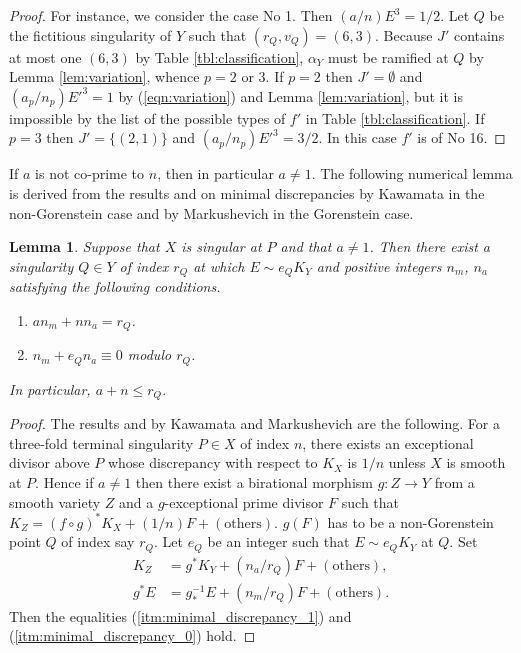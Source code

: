 \documentclass[a4paper,11pt]{amsart}
\newtheorem{lemma}[theorem]{Lemma}
\theoremstyle{definition}
\theoremstyle{remark}
\numberwithin{equation}{section}
\newcommand{\others}{\mathrm{others}}
\begin{document}
\begin{proof}
For instance, we consider the case No 1.
Then $(a/n)E^3=1/2$.
Let $Q$ be the fictitious singularity of $Y$ such that $(r_Q,v_Q)=(6,3)$.
Because $J'$ contains at most one $(6,3)$ by Table \ref{tbl:classification},
$\alpha_Y$ must be ramified at $Q$ by Lemma \ref{lem:variation},
whence $p=2$ or $3$.
If $p=2$ then $J'=\emptyset$ and $(a_p/n_p){E'}^3=1$
by (\ref{eqn:variation}) and Lemma \ref{lem:variation},
but it is impossible by the list of the possible types of $f'$
in Table \ref{tbl:classification}.
If $p=3$ then $J'=\{(2,1)\}$ and $(a_p/n_p){E'}^3=3/2$.
In this case $f'$ is of No 16.
\end{proof}

If $a$ is not co-prime to $n$, then in particular $a\neq1$.
The following numerical lemma is derived from
the results \cite{Km92} and \cite{Ma96} on minimal discrepancies by
Kawamata in the non-Gorenstein case
and by Markushevich in the Gorenstein case.

\begin{lemma}\label{lem:minimal_discrepancy}
Suppose that $X$ is singular at $P$ and that $a \neq 1$.
Then there exist a singularity $Q \in Y$ of index $r_Q$
at which $E \sim e_QK_Y$ and
positive integers $n_m$, $n_a$ satisfying the following conditions.
\begin{enumerate}
\item\label{itm:minimal_discrepancy_1}
$an_m+nn_a=r_Q$.
\item\label{itm:minimal_discrepancy_0}
$n_m+e_Qn_a \equiv 0$ modulo $r_Q$.
\end{enumerate}
In particular, $a+n\le r_Q$.
\end{lemma}

\begin{proof}
The results \cite{Km92} and \cite{Ma96} by Kawamata and Markushevich
are the following.
For a three-fold terminal singularity $P \in X$ of index $n$,
there exists an exceptional divisor above $P$
whose discrepancy with respect to $K_X$ is $1/n$
unless $X$ is smooth at $P$.
Hence if $a\neq1$ then there exist a birational morphism $g \colon Z \to Y$
from a smooth variety $Z$ and a $g$-exceptional prime divisor $F$ such that
$K_Z=(f \circ g)^*K_X+(1/n)F+(\others)$.
$g(F)$ has to be a non-Gorenstein point $Q$ of index say $r_Q$.
Let $e_Q$ be an integer such that $E \sim e_QK_Y$ at $Q$.
Set
\begin{align*}
K_Z &=g^*K_Y + (n_a/r_Q)F+(\others), \\
g^*E &=g^{-1}_*E+(n_m/r_Q)F+(\others).
\end{align*}
Then the equalities
(\ref{itm:minimal_discrepancy_1}) and (\ref{itm:minimal_discrepancy_0}) hold.
\end{proof}
\end{document}
